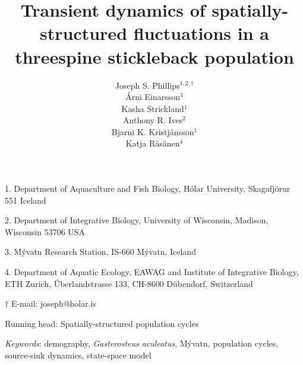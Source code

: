 \documentclass[11pt]{article}
\title{Transient dynamics of spatially-structured fluctuations 
in a threespine stickleback population}
\author{
Joseph S. Phillips$^{1,2, \dagger}$ \\
\'{A}rni Einarsson$^{3}$ \\ 
Kasha Strickland$^{1}$ \\
Anthony R. Ives$^{2}$ \\
Bjarni K. Kristj\'{a}nsson$^{1}$ \\
Katja R\"{a}s\"{a}nen$^{4}$ 
}
\date{}
\begin{document}
\raggedright
\setlength\parindent{0.25in}

\maketitle


\noindent{} 1. Department of Aquaculture and Fish Biology, 
H\'{o}lar University, Skagafj\"{o}r{\dh}ur 551 Iceland

\noindent{} 2. Department of Integrative Biology, 
University of Wisconsin, Madison, Wisconsin 53706 USA

\noindent{} 3. M\'{y}vatn Research Station, IS-660 M\'{y}vatn, Iceland

\noindent{} 4. Department of Aquatic Ecology, EAWAG and 
Institute of Integrative Biology, ETH Zurich, 
\"{U}berlandstrasse 133, CH-8600 D\"{u}bendorf, Switzerland

\noindent{} $\dagger$ E-mail: joseph@holar.is



\bigskip

Running head: {Spatially-structured population cycles}

\linenumbers{}

\clearpage








\bigskip

\textit{Keywords}: {demography, \emph{Gasterosteus aculeatus}, M\'{y}vatn, 
                    population cycles, source-sink dynamics, state-space model}

\clearpage



\end{document}

